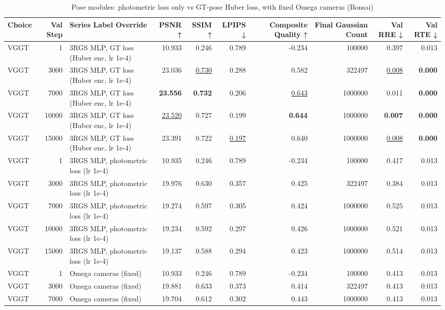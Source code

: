 \begin{table}[H]
\caption{\ifdefined\customcaption \customcaption \else Pose modules: photometric loss only vs GT-pose Huber loss, with fixed Omega cameras (Bonsai) \fi}
\label{tab:108_omega_photo_vs_gt_modules_bonsai}
\centering
\tiny
\begin{tabular}{lrlrrrrrrr}
\toprule
Choice & Val Step & Series Label Override & PSNR ↑ & SSIM ↑ & LPIPS ↓ & Composite Quality ↑ & Final Gaussian Count & Val RRE ↓ & Val RTE ↓ \\
\midrule
VGGT & 1 & 3RGS MLP, GT loss (Huber enc, lr 1e-4) & 10.933 & 0.246 & 0.789 & -0.234 & 100000 & 0.397 & 0.013 \\
VGGT & 3000 & 3RGS MLP, GT loss (Huber enc, lr 1e-4) & 23.036 & \underline{0.730} & 0.288 & 0.582 & 322497 & \underline{0.008} & \textbf{0.000} \\
VGGT & 7000 & 3RGS MLP, GT loss (Huber enc, lr 1e-4) & \textbf{23.556} & \textbf{0.732} & 0.206 & \underline{0.643} & 1000000 & 0.011 & \textbf{0.000} \\
VGGT & 10000 & 3RGS MLP, GT loss (Huber enc, lr 1e-4) & \underline{23.520} & 0.727 & 0.199 & \textbf{0.644} & 1000000 & \textbf{0.007} & \textbf{0.000} \\
VGGT & 15000 & 3RGS MLP, GT loss (Huber enc, lr 1e-4) & 23.391 & 0.722 & \underline{0.197} & 0.640 & 1000000 & \underline{0.008} & \textbf{0.000} \\
VGGT & 1 & 3RGS MLP, photometric loss (lr 1e-4) & 10.935 & 0.246 & 0.789 & -0.234 & 100000 & 0.417 & 0.013 \\
VGGT & 3000 & 3RGS MLP, photometric loss (lr 1e-4) & 19.976 & 0.630 & 0.357 & 0.425 & 322497 & 0.384 & 0.013 \\
VGGT & 7000 & 3RGS MLP, photometric loss (lr 1e-4) & 19.274 & 0.597 & 0.305 & 0.424 & 1000000 & 0.525 & 0.013 \\
VGGT & 10000 & 3RGS MLP, photometric loss (lr 1e-4) & 19.234 & 0.592 & 0.297 & 0.426 & 1000000 & 0.521 & 0.013 \\
VGGT & 15000 & 3RGS MLP, photometric loss (lr 1e-4) & 19.137 & 0.588 & 0.294 & 0.423 & 1000000 & 0.514 & 0.013 \\
VGGT & 1 & Omega cameras (fixed) & 10.933 & 0.246 & 0.789 & -0.234 & 100000 & 0.413 & 0.013 \\
VGGT & 3000 & Omega cameras (fixed) & 19.881 & 0.633 & 0.373 & 0.414 & 322497 & 0.413 & 0.013 \\
VGGT & 7000 & Omega cameras (fixed) & 19.704 & 0.612 & 0.302 & 0.443 & 1000000 & 0.413 & 0.013 \\

\end{tabular}
\end{table}
